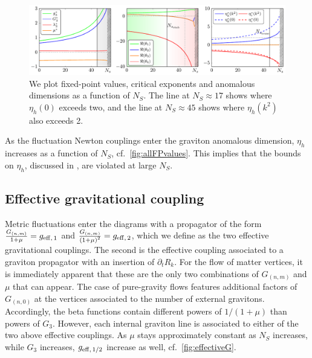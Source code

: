 \documentclass[11pt]{book} %
\begin{document}
%
\begin{widetext}
\begin{figure}
\includegraphics[width=\textwidth]{NS_findiff_all_hss_b.pdf}
\caption{We plot fixed-point values, critical exponents and anomalous dimensions as a function of $N_S$.
	The line at $N_S \approx 17$ shows where $\eta_h(0)$ exceeds two, and the line at $N_S \approx 45$ shows where $\eta_h(k^2)$ also exceeds 2.}
\label{fig:allFPvalues}
\end{figure}
\end{widetext}
%

As the fluctuation Newton couplings enter the graviton anomalous dimension, $\eta_h$ increases as a function of $N_S$, cf.~\autoref{fig:allFPvalues}.
This implies that the bounds on $\eta_h$, discussed in \cite{Meibohm:2015twa}, are violated at large $N_S$.

%
\subsection{Effective gravitational coupling}
%
Metric fluctuations enter the diagrams with a propagator of the form $\frac{G_{(n,m)}}{1+\mu} = g_{\rm eff,\,1}$ and $\frac{G_{(n,m)}}{\left(1+\mu\right)^2}= g_{\rm eff, \, 2}$,
which we define as the two effective gravitational couplings.
The second is the effective coupling associated to a graviton propagator with an insertion of $\partial_t R_k$.
For the flow of matter vertices, it is immediately apparent that these are the only two combinations of $G_{(n,m)}$ and $\mu$ that can appear.
The case of pure-gravity flows features additional factors of $G_{(n,0)}$ at the vertices associated to the number of external gravitons.
Accordingly, the beta functions contain different powers of $1/(1+\mu)$ than powers of $G_3$.
However, each internal graviton line is associated to either of the two above effective couplings.
As $\mu$ stays approximately constant as $N_S$ increases, while $G_3$ increases, $g_{\rm eff,\,1/2}$ increase as well, cf.~\autoref{fig:effectiveG}.
\end{document}
